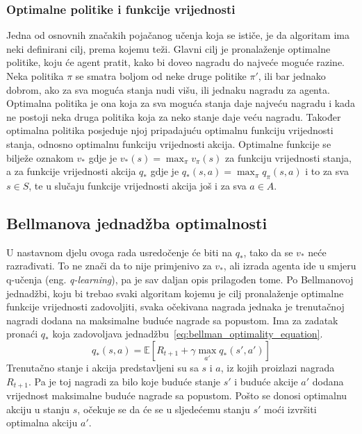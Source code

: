 \subsubsection{Optimalne politike i funkcije vrijednosti}
Jedna od osnovnih značakih pojačanog učenja koja se ističe, je da algoritam ima neki definirani cilj, prema kojemu teži. Glavni cilj je pronalaženje optimalne politike, koju će agent pratit, kako bi doveo nagradu do najveće moguće razine. Neka politika $\pi$ se smatra boljom od neke druge politike $\pi'$, ili bar jednako dobrom, ako za sva moguća stanja nudi višu, ili jednaku nagradu za agenta. Optimalna politika je ona koja za sva moguća stanja daje najveću nagradu i kada ne postoji neka druga politika koja za neko stanje daje veću nagradu. Također optimalna politika posjeduje njoj pripadajuću optimalnu funkciju vrijednosti stanja, odnosno optimalnu funkciju vrijednosti akcija. Optimalne funkcije se bilježe oznakom $v_*$ gdje je $v_*(s) = \max_\pi v_\pi(s)$ za funkciju vrijednosti stanja, a za funkcije vrijednosti akcija $q_*$ gdje je $q_*(s, a) = \max_\pi q_\pi(s, a)$ i to za sva $s \in S$, te u slučaju funkcije vrijednosti akcija još i za sva $a \in A$.

\subsection{Bellmanova jednadžba optimalnosti}
U nastavnom djelu ovoga rada usredočenje će biti na $q_*$, tako da se $v_*$ neće razrađivati. To ne znači da to nije primjenivo za $v_*$, ali izrada agenta ide u smjeru q-učenja (eng. \textit{q-learning}), pa je sav daljan opis prilagođen tome. 
Po Bellmanovoj jednadžbi, koju bi trebao svaki algoritam kojemu je cilj pronalaženje optimalne funkcije vrijednosti zadovoljiti, svaka očekivana nagrada jednaka je trenutačnoj nagradi dodana na maksimalne buduće nagrade sa popustom. Ima za zadatak pronaći $q_*$ koja zadovoljava jednadžbu~\ref{eq:bellman_optimality_equation}.
\begin{equation}\label{eq:bellman_optimality_equation}
q_*(s, a) = \mathbb{E}\left[R_{t+1} + \gamma\max_{a'}q_*(s', a')\right]
\end{equation}
Trenutačno stanje i akcija predstavljeni su sa $s$ i $a$, iz kojih proizlazi nagrada $R_{t+1}$. Pa je toj nagradi za bilo koje buduće stanje $s'$ i buduće akcije $a'$ dodana vrijednost maksimalne buduće nagrade sa popustom. Pošto se donosi optimalnu akciju u stanju $s$, očekuje se da će se u sljedećemu stanju $s'$ moći izvršiti optimalna akciju $a'$.

